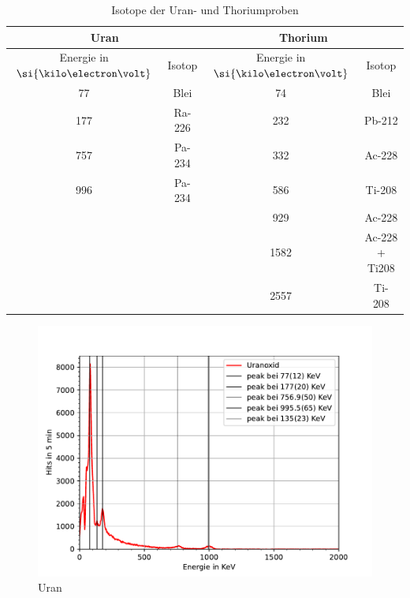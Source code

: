\documentclass[11pt, a4paper]{article}
\begin{document}
    \begin{table}
        \centering
        \begin{tabular}{c|c||c|c}
            \multicolumn{2}{c}{Uran} & \multicolumn{2}{c}{Thorium} \\ \hline
            Energie in $\si{\kilo\electron\volt}$ & Isotop & Energie in $\si{\kilo\electron\volt}$ & Isotop \\ \hline
            77 & Blei & 74 & Blei \\ \hline
            177 & Ra-226 & 232 & Pb-212 \\ \hline
            757 & Pa-234 & 332 & Ac-228 \\ \hline
            996 & Pa-234 & 586 & Ti-208 \\ \hline
            & & 929 & Ac-228 \\ \hline
            & & 1582 & Ac-228 + Ti208\\ \hline
            & & 2557 & Ti- 208

            
        \end{tabular}
        \caption{Isotope der Uran- und Thoriumproben}
        \label{tab:uran}
    \end{table}

    \begin{figure}[!h]
        \centering
        \includegraphics[width=\textwidth]{Plots/Uranox.pdf}
        \caption{Uran}
        \label{fig:uran}
    \end{figure}
\end{document}
